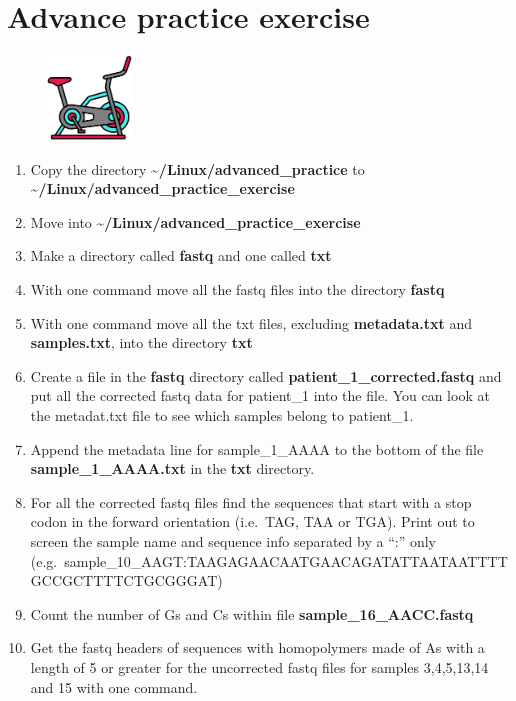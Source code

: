 \documentclass[
  letterpaper,
  DIV=11,
  numbers=noendperiod]{scrreprt}
\providecommand{\tightlist}{%
  \setlength{\itemsep}{0pt}\setlength{\parskip}{0pt}}\usepackage{longtable,booktabs,array}
\begin{document}
\hypertarget{advance-practice-exercise}{%
\chapter{Advance practice exercise}\label{advance-practice-exercise}}

\begin{figure}

{\centering \includegraphics[width=0.2\textwidth,height=\textheight]{figures/adv_exercise.png}

}

\end{figure}

\begin{enumerate}
\def\labelenumi{\arabic{enumi}.}
\tightlist
\item
  Copy the directory \textbf{\textasciitilde/Linux/advanced\_practice}
  to \textbf{\textasciitilde/Linux/advanced\_practice\_exercise}
\item
  Move into \textbf{\textasciitilde/Linux/advanced\_practice\_exercise}
\item
  Make a directory called \textbf{fastq} and one called \textbf{txt}
\item
  With one command move all the fastq files into the directory
  \textbf{fastq}
\item
  With one command move all the txt files, excluding
  \textbf{metadata.txt} and \textbf{samples.txt}, into the directory
  \textbf{txt}
\item
  Create a file in the \textbf{fastq} directory called
  \textbf{patient\_1\_corrected.fastq} and put all the corrected fastq
  data for patient\_1 into the file. You can look at the metadat.txt
  file to see which samples belong to patient\_1.
\item
  Append the metadata line for sample\_1\_AAAA to the bottom of the file
  \textbf{sample\_1\_AAAA.txt} in the \textbf{txt} directory.
\item
  For all the corrected fastq files find the sequences that start with a
  stop codon in the forward orientation (i.e.~TAG, TAA or TGA). Print
  out to screen the sample name and sequence info separated by a ``:''
  only
  (e.g.~sample\_10\_AAGT:TAAGAGAACAATGAACAGATATTAATAATTTTGCCGCTTTTCTGCGGGAT)
\item
  Count the number of Gs and Cs within file
  \textbf{sample\_16\_AACC.fastq}
\item
  Get the fastq headers of sequences with homopolymers made of As with a
  length of 5 or greater for the uncorrected fastq files for samples
  3,4,5,13,14 and 15 with one command.
\end{enumerate}
\end{document}
